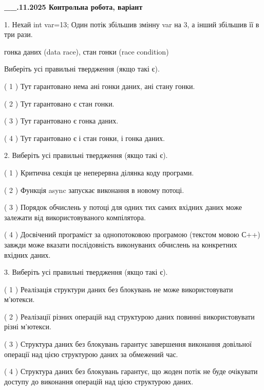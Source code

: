 \documentclass[12pt, ukrainian]{article}
\begin{document}
\newpage
\begin {large}

\textbf{\_\_.11.2025 Контрольна робота, варіант  }\par


{
1. Нехай int var=13; Один потік збільшив змінну var на 3, а інший збільшив її в три рази.

гонка даних (data race), стан гонки (race condition)

Виберіть усі правильні твердження (якщо такі є).\par
\vspace{2mm}
( 1 ) Тут гарантовано нема ані гонки даних, ані стану гонки.%

( 2 ) Тут гарантовано є стан гонки.%

( 3 ) Тут гарантовано є гонка даних.%

( 4 ) Тут гарантовано є і стан гонки, і гонка даних.%


2. Виберіть усі правильні твердження (якщо такі є).\par
\vspace{2mm}

( 1 ) Критична секція це неперервна ділянка коду програми.%

( 2 ) Функція async запускає виконання в новому потоці.%

( 3 ) Порядок обчислень у потоці для одних тих самих вхідних даних може залежати від використовуваного компілятора.%

( 4 ) Досвічений програміст за однопотоковою програмою (текстом мовою С++) завжди може вказати послідовність виконуваних обчислень на конкретних вхідних даних.%


3. Виберіть усі правильні твердження (якщо такі є).\par
\vspace{2mm}

( 1 ) Реалізація структури даних без блокувань не може використовувати м’ютекси.%

( 2 ) Реалізації різних операцій над структурою даних повинні використовувати різні м’ютекси.%

( 3 ) Структура даних без блокувань гарантує завершення виконання довільної операції над цією структурою даних за обмежений час.%

( 4 ) Структура даних без блокувань гарантує, що жоден потік не буде очікувати доступу до виконання операцій над цією структурою даних.%


}
\end{large}
\end{document}
